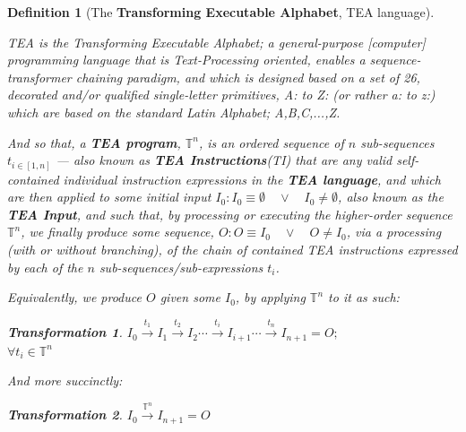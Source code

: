 \documentclass[a4paper, 18pt]{book} %
\newtheorem{defn}{Definition}
\newtheorem{trans}{Transformation}
\begin{document}
\begin{defn}[The \textbf{Transforming Executable Alphabet}, TEA language]
\label{DEFTEA}

TEA is the Transforming Executable Alphabet\cite{lutalo2024software}; a general-purpose [computer] programming language that is Text-Processing oriented, enables a sequence-transformer chaining paradigm\cite{Lutalo2025_transformatics_thesis}, and which is designed based on a set of 26, decorated and/or qualified single-letter primitives, A: to Z: (or rather a: to z:) which are based on the standard Latin Alphabet; {A,B,C,...,Z}\cite{Lutalo2024TEATAZ}.

\vspace{1em}

And so that, a \textbf{TEA program}, $\mathbb{T}^n$, is an ordered sequence of $n$ sub-sequences $t_{i \in [1,n]}$ --- also known as \textbf{TEA Instructions}(TI) that are any valid self-contained individual instruction expressions in the \textbf{TEA language}, and which are then applied to some initial input $I_0: I_0 \equiv \emptyset \quad \lor \quad I_0 \neq \emptyset$, also known as the \textbf{TEA Input}, and such that, by processing or executing the higher-order sequence $\mathbb{T}^n$, we finally produce some sequence, $O: O \equiv I_0 \quad \lor \quad O \neq I_0$, via a processing (with or without branching), of the chain of contained TEA instructions expressed by each of the $n$ sub-sequences/sub-expressions $t_i$. 

\vspace{1em}

Equivalently, we produce $O$ given some $I_0$, by applying $\mathbb{T}^n$ to it as such:

\begin{trans}
\label{TRANSDEFTEA}
$I_0 \xrightarrow{t_1} I_1 \xrightarrow{t_2} I_2 \cdots  \xrightarrow{t_i} I_{i+1} \cdots \xrightarrow{t_n} I_{n+1} = O;$\\
$\forall t_i \in \mathbb{T}^n$
\end{trans}



And more succinctly:

\begin{trans}
\label{TRANSDEFTEAB}
$I_0 \xrightarrow{\mathbb{T}^n} I_{n+1} = O$
\end{trans}

\end{defn}
\end{document}
